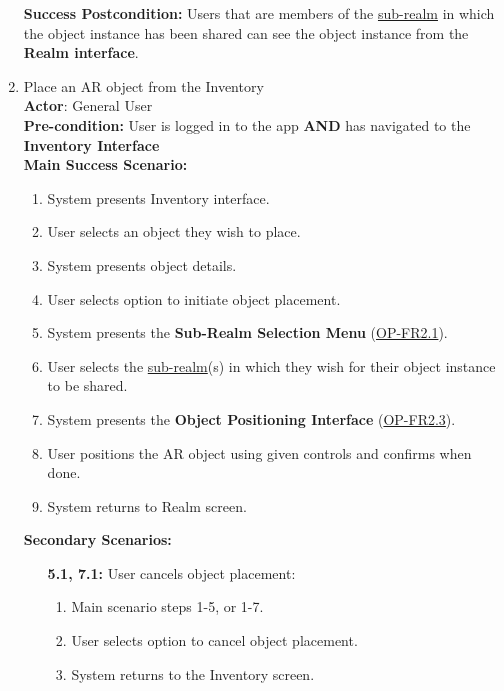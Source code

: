 \documentclass{article}
\begin{document}
\begin{enumerate}[label=\textbf{UC\arabic*}]
          \textbf{Success Postcondition:} Users that are members of the \hyperref[def:sub_realm]{sub-realm} in which the object instance has been shared can see the object instance from the \textbf{Realm interface}.

    \item \label{uc:8} Place an AR object from the Inventory \\
          \textbf{Actor}: General User \\
          \textbf{Pre-condition:} User is logged in to the app \textbf{AND} has navigated to the \textbf{Inventory Interface} \\

          \textbf{Main Success Scenario:}
          \begin{enumerate}[label=\textbf{\arabic*.}]
              \item System presents Inventory interface.
              \item User selects an object they wish to place.
              \item System presents object details.
              \item User selects option to initiate object placement.
              \item System presents the \textbf{Sub-Realm Selection Menu} (\hyperref[ssub:object_placement]{OP-FR2.1}).
              \item User selects the \hyperref[def:sub_realm]{sub-realm}(s) in which they wish for their object instance to be shared.
              \item System presents the \textbf{Object Positioning Interface} (\hyperref[ssub:object_placement]{OP-FR2.3}).
              \item User positions the AR object using given controls and confirms when done.
              \item System returns to Realm screen.
          \end{enumerate}

          \textbf{Secondary Scenarios:}
          \begin{itemize}
              \item[{\bf 5.1, 7.1:}] User cancels object placement:
                    \begin{enumerate}[label=\textbf{\arabic*.}]
                        \item Main scenario steps 1-5, or 1-7.
                        \item User selects option to cancel object placement.
                        \item System returns to the Inventory screen.
                    \end{enumerate}


\end{itemize}
\end{enumerate}
\end{document}
